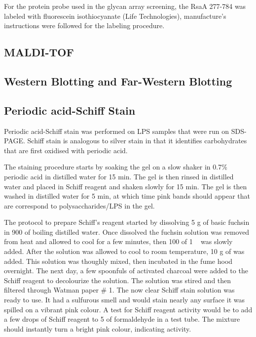     For the protein probe used in the glycan array screening, the RsaA \del{}277-784 was labeled with fluorescein isothiocyanate (Life Technologies), manufacture's instructions were followed for the labeling procedure.
    
    \subsection{\Ac{MALDI-TOF}}\label{sec:acmaldi-tof}
    
    \subsection{Western Blotting and Far-Western Blotting} \label{sec:western-blotting-far}


    \subsection{Periodic acid-Schiff Stain} %
    \label{sub:schiff_stain}
		
    Periodic   acid-Schiff   stain   was   performed   on  \ac{LPS}   samples   that   were   run   on
    \ac{SDS-PAGE}. Schiff stain is analogous to silver  stain in that it identifies carbohydrates that
    are first oxidised with periodic acid.

    The staining procedure starts by soaking the gel on a slow shaker in 0.7\% periodic acid in
    distilled water for 15 min. The gel is then rinsed in distilled water and placed in Schiff reagent
    and shaken slowly for 15 min. The gel is then washed in distilled water for 5 min, at which time
    pink bands should appear that are correspond to polysaccharides/\ac{LPS} in the gel.

    The protocol to prepare Schiff's reagent started by dissolving 5 \si{\gram} of basic fuchsin in
    900 \millilitre of boiling distilled water. Once dissolved the fuchsin solution was removed from
    heat and allowed to cool for a few minutes, then 100 \millilitre of 1 \si{\molar}\  was
    slowly added. After the solution was allowed to cool to room temperature, 10 \si{\gram} of
     was added. This solution was thoughly mixed, then incubated in the fume hood
    overnight. The next day, a few spoonfuls of activated charcoal were added to the Schiff reagent to
    decolourize the solution. The solution was stired and then filtered through Watman paper \# 1. The
    now clear Schiff stain solution was ready to use. It had a sulfurous smell and would stain nearly
    any surface it was spilled on a vibrant pink colour. A test for Schiff reagent activity would be
    to add a few drops of Schiff reagent to 5 \millilitre of formaldehyde in a test tube. The mixture
    should instantly turn a bright pink colour, indicating activity.

